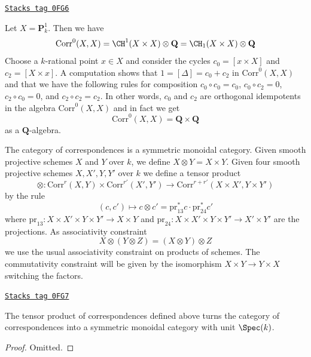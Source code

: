\begin{example}[Decompose P1]
\label{weil-example-decompose-P1}
\href{https://stacks.math.columbia.edu/tag/0FG6}{\texttt{Stacks tag 0FG6}}

Let $X = \mathbf{P}^1_k$. Then we have
$$
\text{Corr}^0(X, X) = \CH^1(X \times X) \otimes \mathbf{Q} =
\CH_1(X \times X) \otimes \mathbf{Q}
$$
Choose a $k$-rational point $x \in X$ and
consider the cycles $c_0 = [x \times X]$ and $c_2 = [X \times x]$.
A computation shows that $1 = [\Delta] = c_0 + c_2$ in $\text{Corr}^0(X, X)$
and that we have the following rules for composition
$c_0 \circ c_0 = c_0$,
$c_0 \circ c_2 = 0$,
$c_2 \circ c_0 = 0$, and
$c_2 \circ c_2 = c_2$.
In other words, $c_0$ and $c_2$ are orthogonal idempotents in
the algebra $\text{Corr}^0(X, X)$ and in fact we get
$$
\text{Corr}^0(X, X) = \mathbf{Q} \times \mathbf{Q}
$$
as a $\mathbf{Q}$-algebra.
\end{example}

The category of correspondences is a symmetric monoidal category.
Given smooth projective schemes $X$ and $Y$ over $k$, we define
$X \otimes Y = X \times Y$. Given four smooth projective schemes
$X, X', Y, Y'$ over $k$ we define a tensor product
$$
\otimes :
\text{Corr}^r(X, Y) \times \text{Corr}^{r'}(X', Y')
\longrightarrow
\text{Corr}^{r + r'}(X \times X', Y \times Y')
$$
by the rule
$$
(c, c') \longmapsto
c \otimes c' = \text{pr}_{13}^*c \cdot \text{pr}_{24}^*c'
$$
where $\text{pr}_{13} : X \times X' \times Y \times Y' \to X \times Y$
and $\text{pr}_{24} : X \times X' \times Y \times Y' \to X' \times Y'$
are the projections. As associativity constraint
$$
X \otimes (Y \otimes Z) = (X \otimes Y) \otimes Z
$$
we use the usual associativity constraint on products of schemes.
The commutativity constraint will be given by the isomorphism
$X \times Y \to Y \times X$ switching the factors.

\begin{lemma}
\label{weil-lemma-tensor-product}
\href{https://stacks.math.columbia.edu/tag/0FG7}{\texttt{Stacks tag 0FG7}}

The tensor product of correspondences defined above turns the category of
correspondences into a symmetric monoidal category with unit $\Spec(k)$.
\end{lemma}

\begin{proof}
Omitted.
\end{proof}

